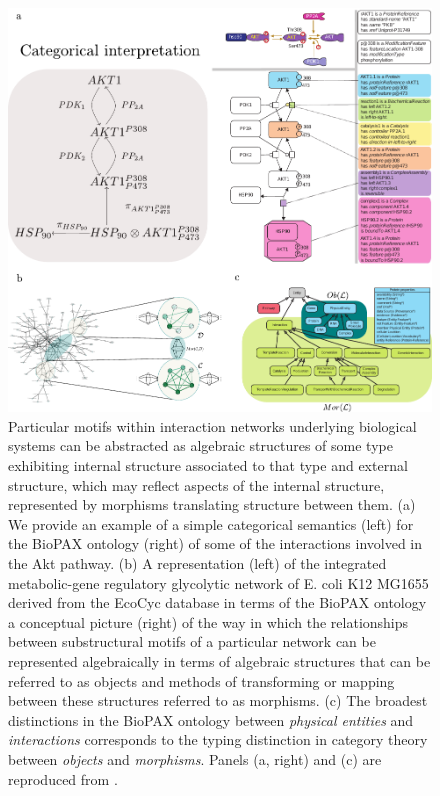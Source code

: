 \documentclass[aps,twocolumn]{revtex4-1}
\begin{document}
\begin{figure}
\noindent\includegraphics[width=2\columnwidth]{fig/Fig1Composite.pdf}
\caption{Particular motifs within interaction networks underlying biological systems can be abstracted as algebraic structures of some type exhibiting internal structure associated to that type and external structure, which may reflect aspects of the internal structure, represented by morphisms translating structure between them. (a) We provide an example of a simple categorical semantics (left) for the BioPAX ontology \cite{Demir2010} (right) of some of the interactions involved in the Akt pathway. (b) A representation (left) of the integrated metabolic-gene regulatory glycolytic network of E. coli K12 MG1655 derived from the EcoCyc database \cite{Keseler2011} in terms of the BioPAX ontology a conceptual picture (right) of the way in which the relationships between substructural motifs of a particular network can be represented algebraically in terms of algebraic structures that can be referred to as objects and methods of transforming or mapping between these structures referred to as morphisms. (c) The broadest distinctions in the BioPAX ontology between {\it physical entities} and {\it interactions} corresponds to the typing distinction in category theory between {\it objects} and {\it morphisms}. Panels (a, right) and (c) are reproduced from \cite{Demir2010}.}
\label{fig:biograph}
\end{figure}
\end{document}
